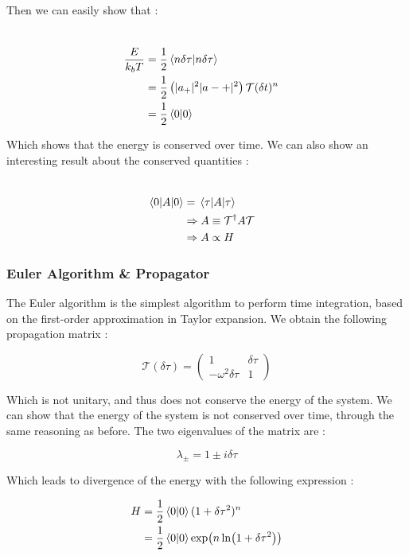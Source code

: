 \documentclass[ansiapaper]{report}
\begin{document}
\begin{multicols}{3}
  Then we can easily show that :

  \begin{align*}
    \\ \frac{E}{k_bT} &= \frac{1}{2}\braket{n \delta \tau}{n \delta \tau}
    \\ &=\frac{1}{2}\left(\lvert a_+ \rvert^2 \lvert a-+ \rvert^2 \right)\mathcal{T}(\delta t)^n
    \\ &= \frac{1}{2} \braket{0}{0}
  \end{align*}

  Which shows that the energy is conserved over time. We can also show an interesting result about the conserved quantities :

  \begin{align*}
    \\ \expval{A}{0} &=\expval{A}{\tau}
    \\  & \Rightarrow A \equiv \mathcal{T}^\dagger A \mathcal{T}
    \\ & \Rightarrow A \propto H
  \end{align*}

  \subsubsection{Euler Algorithm \& Propagator}

  The Euler algorithm is the simplest algorithm to perform time integration, based on the first-order approximation in Taylor expansion. We obtain the following propagation matrix :

  $$ \mathcal{T}(\delta \tau) =
    \begin{pmatrix}
      1                     & \delta \tau \\
      -\omega^2 \delta \tau & 1
    \end{pmatrix}
  $$

  Which is not unitary, and thus does not conserve the energy of the system. We can show that the energy of the system is not conserved over time, through the same reasoning as before. The two eigenvalues of the matrix are :

  $$ \lambda_\pm = 1 \pm i \delta \tau$$

  Which leads to divergence of the energy with the following expression :

  \begin{align*}
    H & = \frac{1}{2}\braket{0}{0}(1 + \delta \tau^2)^n          \\
      & = \frac{1}{2}\braket{0}{0}\exp(n \ln(1 + \delta \tau^2))
    \\
  \end{align*}


\end{multicols}
\end{document}

